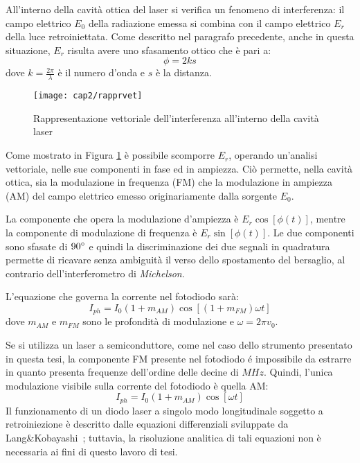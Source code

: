 All'interno della cavità ottica del laser si verifica un fenomeno di interferenza: il campo elettrico $E_0$ della radiazione emessa si combina con il campo elettrico $E_r$ della luce retroiniettata. Come descritto nel paragrafo precedente, anche in questa situazione, $E_r$ risulta avere uno sfasamento ottico che è pari a:
\begin{equation}
	\phi=2ks
\end{equation}
dove $k=\frac{2\pi}{\lambda}$ è il numero d'onda e $s$ è la distanza.
\begin{figure}  
  \begin{center}
    \texttt{[image: cap2/rapprvet]}
    \caption{Rappresentazione vettoriale dell'interferenza all'interno della cavità laser}
    \label{rapprvet}
  \end{center}
\end{figure}
Come mostrato in Figura \ref{rapprvet} è possibile scomporre $E_r$, operando un'analisi vettoriale, nelle sue componenti in fase ed in ampiezza. Ciò permette, nella cavità ottica, sia la modulazione in frequenza (FM) che la modulazione in ampiezza (AM) del campo elettrico emesso originariamente dalla sorgente $E_0$. 

La componente che opera la modulazione d'ampiezza è $E_r\cos[\phi(t)]$, mentre la componente di modulazione di frequenza è $E_r\sin[\phi(t)]$. Le due componenti sono sfasate di $90\degree$ e quindi la discriminazione dei due segnali in quadratura permette di ricavare senza ambiguità il verso dello spostamento del bersaglio, al contrario dell'interferometro di \textit{Michelson}.

L'equazione che governa la corrente nel fotodiodo sarà:
\begin{equation}
	I_{ph}=I_0(1+m_{AM})\cos{[(1+m_{FM})\omega t]}
\end{equation}
dove $m_{AM}$ e $m_{FM}$ sono le profondità di modulazione e $\omega = 2\pi v_0$.

Se si utilizza un laser a semiconduttore, come nel caso dello strumento presentato in questa tesi, la componente FM presente nel fotodiodo é impossibile da estrarre in quanto presenta frequenze dell'ordine delle decine di $MHz$. Quindi, l'unica modulazione visibile sulla corrente del fotodiodo è quella AM:
\begin{equation}
	I_{ph}=I_0(1+m_{AM})\cos{[\omega t]}
\end{equation}
Il funzionamento di un diodo laser a singolo modo longitudinale soggetto a retroiniezione è descritto dalle equazioni differenziali sviluppate da Lang\&Kobayashi~\cite{1070479}; tuttavia, la risoluzione analitica di tali equazioni non è necessaria ai fini di questo lavoro di tesi.

